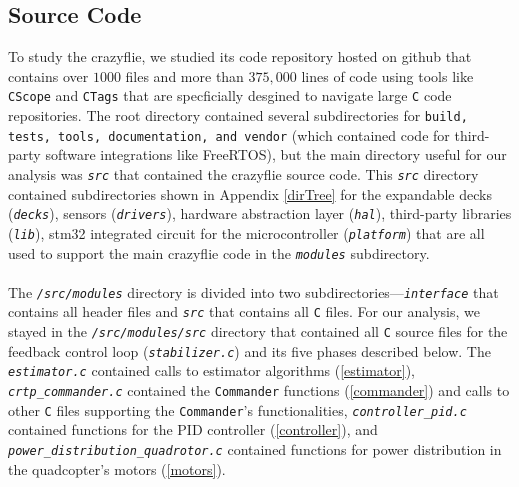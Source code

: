 \documentclass[10pt, a4paper]{article}
\newcommand{\textFunc}[1]{\texttt{\textit{#1}}}
\newcommand{\textDef}[1]{\texttt{#1}}
\newcommand{\app}[1]{Appendix \ref{#1}}
\begin{document}
    \subsection{Source Code}
    To study the crazyflie, we studied its code repository hosted on github \cite{firmware} that contains over $1000$ files and more than $375,000$ lines of code using tools like \textDef{CScope} and \textDef{CTags} that are specficially desgined to navigate large \textDef{C} code repositories. The root directory contained several subdirectories for \textDef{build, tests, tools, documentation, and vendor} (which contained code for third-party software integrations like FreeRTOS), but the main directory useful for our analysis was \textFunc{src} that contained the crazyflie source code. This \textFunc{src} directory contained subdirectories shown in \app{dirTree} for the expandable decks \cite{Decks} (\textFunc{decks}), sensors (\textFunc{drivers}), hardware abstraction layer (\textFunc{hal}), third-party libraries (\textFunc{lib}), stm32 integrated circuit for the microcontroller  (\textFunc{platform}) that are all used to support the main crazyflie code in the \textFunc{modules} subdirectory. 
    \\ \\
    The \textFunc{/src/modules} directory is divided into two subdirectories---\textFunc{interface} that contains all header files and \textFunc{src} that contains all \textDef{C} files. For our analysis, we stayed in the \textFunc{/src/modules/src} directory that contained all \textDef{C} source files for the feedback control loop (\textFunc{stabilizer.c}) and its five phases described below. The \textFunc{estimator.c} contained calls to estimator algorithms (\ref{estimator}), \textFunc{crtp\_commander.c} contained the \textDef{Commander} functions (\ref{commander}) and calls to other \textDef{C} files supporting the \textDef{Commander}'s functionalities, \textFunc{controller\_pid.c} contained functions for the PID controller (\ref{controller}), and \textFunc{power\_distribution\_quadrotor.c} contained functions for power distribution in the quadcopter's motors (\ref{motors}).
\end{document}
